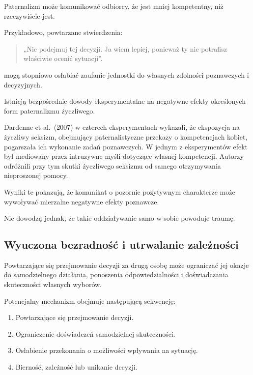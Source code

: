 \documentclass[11pt,a4paper,oneside,headinclude=true,footinclude=false]{scrartcl}
\providecommand{\tightlist}{\setlength{\itemsep}{3pt}\setlength{\parskip}{0pt}}
\begin{document}
Paternalizm może komunikować odbiorcy, że jest mniej kompetentny, niż
rzeczywiście jest.

Przykładowo, powtarzane stwierdzenia:

\begin{quote}
„Nie podejmuj tej decyzji. Ja wiem lepiej, ponieważ ty nie potrafisz
właściwie ocenić sytuacji''.
\end{quote}

mogą stopniowo osłabiać zaufanie jednostki do własnych zdolności
poznawczych i decyzyjnych.

Istnieją bezpośrednie dowody eksperymentalne na negatywne efekty
określonych form paternalizmu życzliwego.

Dardenne et al.~(2007) w czterech eksperymentach wykazali, że ekspozycja
na życzliwy seksizm, obejmujący paternalistyczne przekazy o
kompetencjach kobiet, pogarszała ich wykonanie zadań poznawczych. W
jednym z eksperymentów efekt był mediowany przez intruzywne myśli
dotyczące własnej kompetencji. Autorzy odróżnili przy tym skutki
życzliwego seksizmu od samego otrzymywania nieproszonej pomocy.

Wyniki te pokazują, że komunikat o pozornie pozytywnym charakterze może
wywoływać mierzalne negatywne efekty poznawcze.

Nie dowodzą jednak, że takie oddziaływanie samo w sobie powoduje traumę.

\subsection{Wyuczona bezradność i utrwalanie zależności}\label{subsec:3.3}

Powtarzające się przejmowanie decyzji za drugą osobę może ograniczać jej
okazje do samodzielnego działania, ponoszenia odpowiedzialności i
doświadczania skuteczności własnych wyborów.

Potencjalny mechanizm obejmuje następującą sekwencję:

\begin{enumerate}
\def\labelenumi{\arabic{enumi}.}
\tightlist
\item
  Powtarzające się przejmowanie decyzji.
\item
  Ograniczenie doświadczeń samodzielnej skuteczności.
\item
  Osłabienie przekonania o możliwości wpływania na sytuację.
\item
  Bierność, zależność lub unikanie decyzji.
\end{enumerate}
\end{document}
